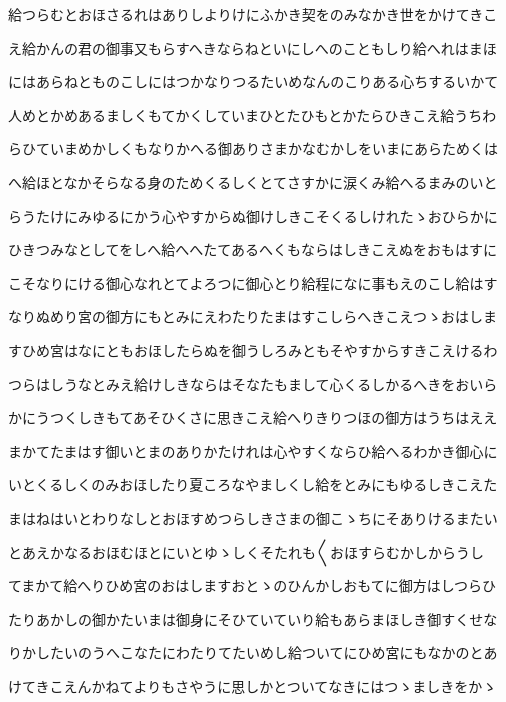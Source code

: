 \documentclass[a4paper,11pt,landscape]{ltjtarticle}
\begin{document}
給つらむとおほさるれはありしよりけにふかき契をのみなかき世をかけてきこ
\par\medskip
え給かんの君の御事又もらすへきならねといにしへのこともしり給へれはまほ
\par\medskip
にはあらねとものこしにはつかなりつるたいめなんのこりある心ちするいかて
\par\medskip
人めとかめあるましくもてかくしていまひとたひもとかたらひきこえ給うちわ
\par\medskip
らひていまめかしくもなりかへる御ありさまかなむかしをいまにあらためくは
\par\medskip
へ給ほとなかそらなる身のためくるしくとてさすかに涙くみ給へるまみのいと
\par\medskip
らうたけにみゆるにかう心やすからぬ御けしきこそくるしけれたゝおひらかに
\par\medskip
ひきつみなとしてをしへ給へへたてあるへくもならはしきこえぬをおもはすに
\par\medskip
こそなりにける御心なれとてよろつに御心とり給程になに事もえのこし給はす
\par\medskip
なりぬめり宮の御方にもとみにえわたりたまはすこしらへきこえつゝおはしま
\par\medskip
すひめ宮はなにともおほしたらぬを御うしろみともそやすからすきこえけるわ
\par\medskip
つらはしうなとみえ給けしきならはそなたもまして心くるしかるへきをおいら
\par\medskip
かにうつくしきもてあそひくさに思きこえ給へりきりつほの御方はうちはええ
\par\medskip
まかてたまはす御いとまのありかたけれは心やすくならひ給へるわかき御心に
\par\medskip
いとくるしくのみおほしたり夏ころなやましくし給をとみにもゆるしきこえた
\par\medskip
まはねはいとわりなしとおほすめつらしきさまの御こゝちにそありけるまたい
\par\medskip
とあえかなるおほむほとにいとゆゝしくそたれも〱おほすらむかしからうし
\par\medskip
てまかて給へりひめ宮のおはしますおとゝのひんかしおもてに御方はしつらひ
\par\medskip
たりあかしの御かたいまは御身にそひていていり給もあらまほしき御すくせな
\par\medskip
りかしたいのうへこなたにわたりてたいめし給ついてにひめ宮にもなかのとあ
\par\medskip
けてきこえんかねてよりもさやうに思しかとついてなきにはつゝましきをかゝ
\par\medskip
\end{document}
